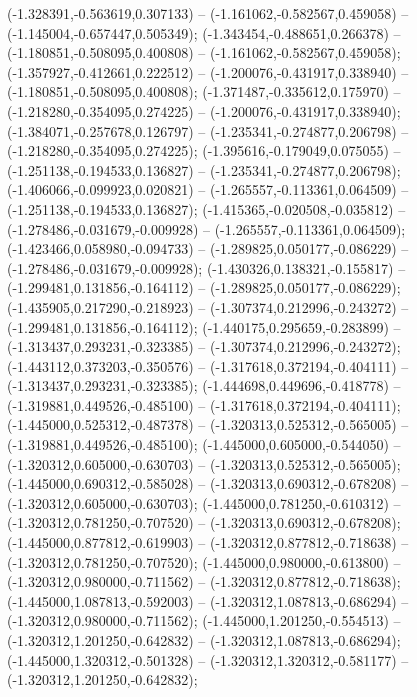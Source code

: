  (-1.328391,-0.563619,0.307133) -- (-1.161062,-0.582567,0.459058) -- (-1.145004,-0.657447,0.505349);
 (-1.343454,-0.488651,0.266378) -- (-1.180851,-0.508095,0.400808) -- (-1.161062,-0.582567,0.459058);
 (-1.357927,-0.412661,0.222512) -- (-1.200076,-0.431917,0.338940) -- (-1.180851,-0.508095,0.400808);
 (-1.371487,-0.335612,0.175970) -- (-1.218280,-0.354095,0.274225) -- (-1.200076,-0.431917,0.338940);
 (-1.384071,-0.257678,0.126797) -- (-1.235341,-0.274877,0.206798) -- (-1.218280,-0.354095,0.274225);
 (-1.395616,-0.179049,0.075055) -- (-1.251138,-0.194533,0.136827) -- (-1.235341,-0.274877,0.206798);
 (-1.406066,-0.099923,0.020821) -- (-1.265557,-0.113361,0.064509) -- (-1.251138,-0.194533,0.136827);
 (-1.415365,-0.020508,-0.035812) -- (-1.278486,-0.031679,-0.009928) -- (-1.265557,-0.113361,0.064509);
 (-1.423466,0.058980,-0.094733) -- (-1.289825,0.050177,-0.086229) -- (-1.278486,-0.031679,-0.009928);
 (-1.430326,0.138321,-0.155817) -- (-1.299481,0.131856,-0.164112) -- (-1.289825,0.050177,-0.086229);
 (-1.435905,0.217290,-0.218923) -- (-1.307374,0.212996,-0.243272) -- (-1.299481,0.131856,-0.164112);
 (-1.440175,0.295659,-0.283899) -- (-1.313437,0.293231,-0.323385) -- (-1.307374,0.212996,-0.243272);
 (-1.443112,0.373203,-0.350576) -- (-1.317618,0.372194,-0.404111) -- (-1.313437,0.293231,-0.323385);
 (-1.444698,0.449696,-0.418778) -- (-1.319881,0.449526,-0.485100) -- (-1.317618,0.372194,-0.404111);
 (-1.445000,0.525312,-0.487378) -- (-1.320313,0.525312,-0.565005) -- (-1.319881,0.449526,-0.485100);
 (-1.445000,0.605000,-0.544050) -- (-1.320312,0.605000,-0.630703) -- (-1.320313,0.525312,-0.565005);
 (-1.445000,0.690312,-0.585028) -- (-1.320313,0.690312,-0.678208) -- (-1.320312,0.605000,-0.630703);
 (-1.445000,0.781250,-0.610312) -- (-1.320312,0.781250,-0.707520) -- (-1.320313,0.690312,-0.678208);
 (-1.445000,0.877812,-0.619903) -- (-1.320312,0.877812,-0.718638) -- (-1.320312,0.781250,-0.707520);
 (-1.445000,0.980000,-0.613800) -- (-1.320312,0.980000,-0.711562) -- (-1.320312,0.877812,-0.718638);
 (-1.445000,1.087813,-0.592003) -- (-1.320312,1.087813,-0.686294) -- (-1.320312,0.980000,-0.711562);
 (-1.445000,1.201250,-0.554513) -- (-1.320312,1.201250,-0.642832) -- (-1.320312,1.087813,-0.686294);
 (-1.445000,1.320312,-0.501328) -- (-1.320312,1.320312,-0.581177) -- (-1.320312,1.201250,-0.642832);
